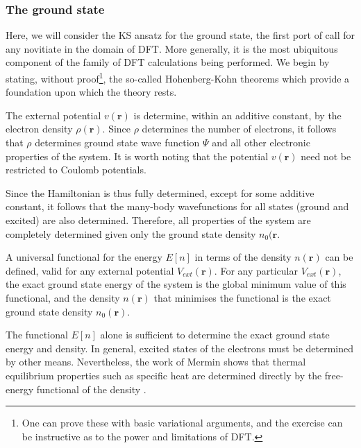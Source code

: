 \subsubsection{The ground state}
\label{sec:dft_gs}
Here, we will consider the KS ansatz for the ground state, the first port of call for any novitiate in the domain of DFT. More generally, it is the most ubiquitous component of the family of DFT calculations being performed. We begin by stating, without proof\footnote{One can prove these with basic variational arguments, and the exercise can be instructive as to the power and limitations of DFT.}, the so-called Hohenberg-Kohn theorems which provide a foundation upon which the theory rests.

\begin{theorem}
\label{thrm:HK1}
The external potential $v(\textbf{r})$ is determine, within an additive constant, by the electron density $\rho(\textbf{r})$. Since $\rho$ determines the number of electrons, it follows that $\rho$ determines ground state wave function $\Psi$ and all other electronic properties of the system. It is worth noting that the potential $v(\textbf{r})$ need not be restricted to Coulomb potentials.
\end{theorem}

\begin{corollary}
\label{cor:HK1}
Since the Hamiltonian is thus fully determined, except for some additive constant, it follows that the many-body wavefunctions for all states (ground and excited) are also determined. Therefore, all properties of the system are completely determined given only the ground state density $n_{0}(\textbf{r}$.
\end{corollary}

\begin{theorem}
\label{thrm:HK2}
A universal functional for the energy $E\left[ n \right]$ in terms of the density $n(\textbf{r})$ can be defined, valid for any external potential $V_{ext}(\textbf{r})$. For any particular $V_{ext}(\textbf{r})$, the exact ground state energy of the system is the global minimum value of this functional, and the density $n(\textbf{r})$ that minimises the functional is the exact ground state density $n_{0}(\textbf{r})$.
\end{theorem}

\begin{corollary}
\label{cor:HK2}
The functional $E\left[ n \right]$ alone is sufficient to determine the exact ground state energy and density. In general, excited states of the electrons must be determined by other means. Nevertheless, the work of Mermin shows that thermal equilibrium properties such as specific heat are determined directly by the free-energy functional of the density \cite{PhysRev.137.A1441}.
\end{corollary}

